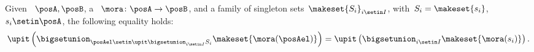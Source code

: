 \begin{lemma}
    \label{lem:unpack_u_functor}
    Given ~$\posA,\posB$, a ~$\mora \colon \posA \to \posB$, and a family of singleton sets~$\makeset{S_i}_{i\setin I}$, with~$S_i=\makeset{s_i}$,~$s_i\setin \posA$, the following equality holds:
    \begin{equation}
        \label{eq:lemma_unpack}
        \upit \left( \bigsetunion_{\posAel \setin \upit \bigsetunion_{i\setin I}S_i}\makeset{\mora(\posAel)}\right)= \upit \left( \bigsetunion_{i\setin I} \makeset{\mora(s_i)}\right).
    \end{equation}
\end{lemma}


